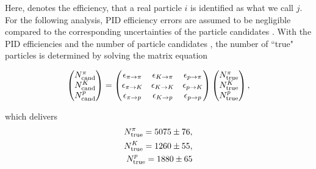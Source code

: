 Here,  denotes the efficiency, that a real particle $i$ is identified as what we call $j$. 
For the following analysis, PID efficiency errors are assumed to be negligible compared to the corresponding uncertainties of the particle candidates .
With the PID efficiencies  and the number of particle candidates , the number of ``true" particles is determined by solving the matrix equation

\begin{align*}
    \begin{pmatrix} 
        N_{\text{cand}}^{\pi} \\ N_{\text{cand}}^{{K}} \\ N_{\text{cand}}^{{p}}
    \end{pmatrix}
    =
    \begin{pmatrix}
       \epsilon_{{\pi}\rightarrow{\pi}}     & \epsilon_{{{K}}\rightarrow{\pi}}     & \epsilon_{{{p}}\rightarrow{\pi}} \\
       \epsilon_{{\pi}\rightarrow{{\ensuremath{K}}}}   & \epsilon_{{{K}}\rightarrow{{\ensuremath{K}}}}   & \epsilon_{{{p}}\rightarrow{{\ensuremath{K}}}} \\
       \epsilon_{{\pi}\rightarrow{{\ensuremath{p}}}} & \epsilon_{{{K}}\rightarrow{{\ensuremath{p}}}} & \epsilon_{{{p}}\rightarrow{{\ensuremath{p}}}} 
    \end{pmatrix}
    \begin{pmatrix} 
        N_{\text{true}}^{\pi} \\ N_{\text{true}}^{{K}} \\ N_{\text{true}}^{{p} }
    \end{pmatrix},
\end{align*}

which delivers
\begin{align}
    N_{\text{true}}^{\pi}     = 5075 \pm 76, \\ 
    N_{\text{true}}^{{K}}   = 1260 \pm 55, \\ 
    N_{\text{true}}^{{p}} = 1880 \pm 65 
\end{align}


